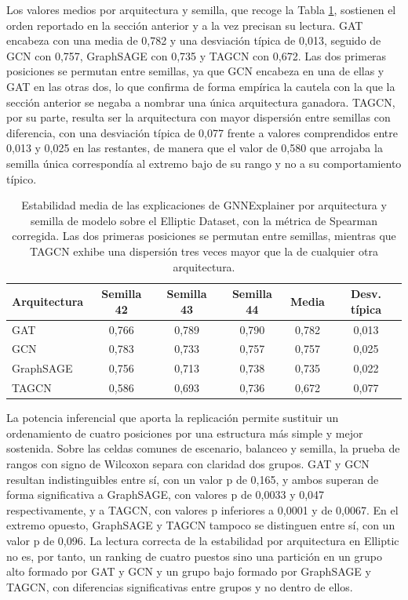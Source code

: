 Los valores medios por arquitectura y semilla, que recoge la Tabla \ref{tab:seeds}, sostienen el orden reportado en la sección anterior y a la vez precisan su lectura. GAT encabeza con una media de 0,782 y una desviación típica de 0,013, seguido de GCN con 0,757, GraphSAGE con 0,735 y TAGCN con 0,672. Las dos primeras posiciones se permutan entre semillas, ya que GCN encabeza en una de ellas y GAT en las otras dos, lo que confirma de forma empírica la cautela con la que la sección anterior se negaba a nombrar una única arquitectura ganadora. TAGCN, por su parte, resulta ser la arquitectura con mayor dispersión entre semillas con diferencia, con una desviación típica de 0,077 frente a valores comprendidos entre 0,013 y 0,025 en las restantes, de manera que el valor de 0,580 que arrojaba la semilla única correspondía al extremo bajo de su rango y no a su comportamiento típico.

\begin{table}[htbp]
    \centering
    \renewcommand{\arraystretch}{1.3}
    \begin{tabular}{lccccc}
    \toprule
    \textbf{Arquitectura} & \textbf{Semilla 42} & \textbf{Semilla 43} & \textbf{Semilla 44} & \textbf{Media} & \textbf{Desv. típica} \\
    \midrule
    GAT       & 0,766 & 0,789 & 0,790 & 0,782 & 0,013 \\
    GCN       & 0,783 & 0,733 & 0,757 & 0,757 & 0,025 \\
    GraphSAGE & 0,756 & 0,713 & 0,738 & 0,735 & 0,022 \\
    TAGCN     & 0,586 & 0,693 & 0,736 & 0,672 & 0,077 \\
    \bottomrule
    \end{tabular}
    \caption{Estabilidad media de las explicaciones de GNNExplainer por arquitectura y semilla de modelo sobre el Elliptic Dataset, con la métrica de Spearman corregida. Las dos primeras posiciones se permutan entre semillas, mientras que TAGCN exhibe una dispersión tres veces mayor que la de cualquier otra arquitectura.}
    \label{tab:seeds}
\end{table}

La potencia inferencial que aporta la replicación permite sustituir un ordenamiento de cuatro posiciones por una estructura más simple y mejor sostenida. Sobre las celdas comunes de escenario, balanceo y semilla, la prueba de rangos con signo de Wilcoxon separa con claridad dos grupos. GAT y GCN resultan indistinguibles entre sí, con un valor p de 0,165, y ambos superan de forma significativa a GraphSAGE, con valores p de 0,0033 y 0,047 respectivamente, y a TAGCN, con valores p inferiores a 0,0001 y de 0,0067. En el extremo opuesto, GraphSAGE y TAGCN tampoco se distinguen entre sí, con un valor p de 0,096. La lectura correcta de la estabilidad por arquitectura en Elliptic no es, por tanto, un ranking de cuatro puestos sino una partición en un grupo alto formado por GAT y GCN y un grupo bajo formado por GraphSAGE y TAGCN, con diferencias significativas entre grupos y no dentro de ellos.

